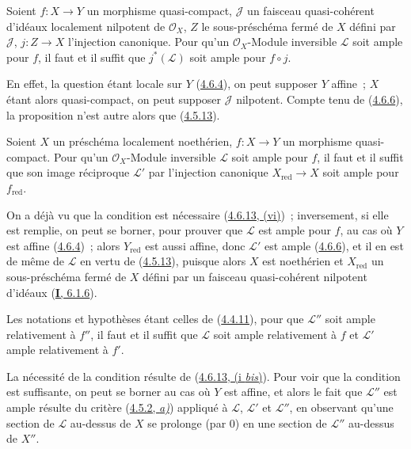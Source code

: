 \begin{proposition}[4.6.15]
\label{II.4.6.15-fr}
Soient $f:X\to Y$ un morphisme quasi-compact, $\mathcal{J}$ un faisceau
quasi-cohérent d'idéaux localement nilpotent de $\mathcal{O}_X$, $Z$ le
sous-préschéma fermé de $X$ défini par $\mathcal{J}$, $j:Z\to X$
l'injection canonique. Pour qu'un $\mathcal{O}_X$-Module inversible
$\mathcal{L}$ soit ample pour $f$, il faut et il suffit que
$j^*(\mathcal{L})$ soit ample pour $f\circ j$.
\end{proposition}

En effet, la question étant locale sur $Y$
(\hyperref[II.4.6.4-fr]{4.6.4}), on peut supposer $Y$ affine~; $X$ étant
alors quasi-compact, on peut supposer $\mathcal{J}$ nilpotent. Compte tenu
de (\hyperref[II.4.6.6-fr]{4.6.6}), la proposition n'est autre alors que
(\hyperref[II.4.5.13-fr]{4.5.13}).

\begin{corollary}[4.6.16]
\label{II.4.6.16-fr}
Soient $X$ un préschéma localement noethérien, $f:X\to Y$ un morphisme
quasi-compact. Pour qu'un $\mathcal{O}_X$-Module inversible $\mathcal{L}$
soit ample pour $f$, il faut et il suffit que son image réciproque
$\mathcal{L}'$ par l'injection canonique $X_{\mathrm{red}}\to X$ soit ample
pour $f_{\mathrm{red}}$.
\end{corollary}

On a déjà vu que la condition est nécessaire
(\hyperref[II.4.6.13-fr]{4.6.13, (vi)})~; inversement, si elle est remplie,
on peut se borner, pour prouver que $\mathcal{L}$ est ample pour $f$, au
cas où $Y$ est affine (\hyperref[II.4.6.4-fr]{4.6.4})~; alors
$Y_{\mathrm{red}}$ est aussi affine, donc $\mathcal{L}'$ est ample
(\hyperref[II.4.6.6-fr]{4.6.6}), et il en est de même de $\mathcal{L}$ en
vertu de (\hyperref[II.4.5.13-fr]{4.5.13}), puisque alors $X$ est
noethérien et $X_{\mathrm{red}}$ un sous-préschéma fermé de $X$ défini par
un faisceau quasi-cohérent nilpotent d'idéaux
(\hyperref[I.6.1.6-fr]{\textbf{I}, 6.1.6}).

\begin{proposition}[4.6.17]
\label{II.4.6.17-fr}
Les notations et hypothèses étant celles de
\textup{(\hyperref[II.4.4.11-fr]{4.4.11})}, pour que $\mathcal{L}''$ soit ample
relativement à $f''$, il faut et il suffit que $\mathcal{L}$ soit ample
relativement à $f$ et $\mathcal{L}'$ ample relativement à $f'$.
\end{proposition}


La nécessité de la condition résulte de
(\hyperref[II.4.6.13-fr]{4.6.13, (i \emph{bis})}). Pour voir que la condition est
suffisante, on peut se borner au cas où $Y$ est affine, et alors le fait
que $\mathcal{L}''$ est ample résulte du critère
(\hyperref[II.4.5.2-fr]{4.5.2, \emph{a)}}) appliqué à $\mathcal{L}$,
$\mathcal{L}'$ et $\mathcal{L}''$, en observant qu'une section de
$\mathcal{L}$ au-dessus de $X$ se prolonge (par $0$) en une section de
$\mathcal{L}''$ au-dessus de $X''$.

